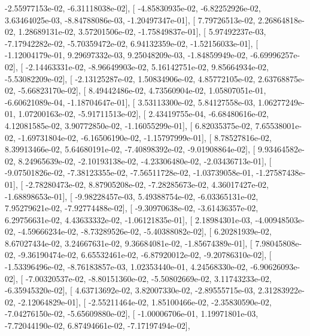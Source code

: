 \documentclass{article}
\begin{document}
         -2.55977153e-02,  -6.31118038e-02],
       [ -4.85830935e-02,  -6.82252926e-02,   3.63464025e-03,
         -8.84788086e-03,  -1.20497347e-01],
       [  7.79726513e-02,   2.26864818e-02,   1.28689131e-02,
          3.57201506e-02,  -1.75849837e-01],
       [  5.97492237e-03,  -7.17942282e-02,  -5.70359472e-02,
          6.94132359e-02,  -1.52156033e-01],
       [ -1.12004179e-01,   9.29697332e-03,   9.25048209e-03,
         -1.84859949e-02,  -6.69996257e-02],
       [ -2.14463331e-02,  -8.96649903e-02,   5.16142751e-02,
          9.85664934e-02,  -5.53082209e-02],
       [ -2.13125287e-02,   1.50834906e-02,   4.85772105e-02,
          2.63768875e-02,  -5.66823170e-02],
       [  8.49442486e-02,   4.73560904e-02,   1.05807051e-01,
         -6.60621089e-04,  -1.18704647e-01],
       [  3.53113300e-02,   5.84127558e-03,   1.06277249e-01,
          1.07200163e-02,  -5.91711513e-02],
       [  2.43419755e-04,  -6.68480616e-02,   4.12081585e-02,
          3.90772850e-02,  -1.16055299e-01],
       [  6.82035375e-02,   7.65538001e-02,  -1.69731804e-02,
         -6.16506190e-02,  -1.15797999e-01],
       [  8.78527816e-02,   8.39913466e-02,   5.64680191e-02,
         -7.40898392e-02,  -9.01908864e-02],
       [  9.93464582e-02,   8.24965639e-02,  -2.10193138e-02,
         -4.23306480e-02,  -2.03436713e-01],
       [ -9.07501826e-02,  -7.38123355e-02,  -7.56511728e-02,
         -1.03739058e-01,  -1.27587438e-01],
       [ -2.78280473e-02,   8.87905208e-02,  -7.28285673e-02,
          4.36017427e-02,  -1.68898653e-01],
       [ -9.98228457e-03,   5.49388754e-02,  -6.03365131e-02,
          7.95279621e-02,  -7.92774488e-02],
       [ -9.30970638e-02,  -3.61436357e-02,   6.29756631e-02,
          4.43633332e-02,  -1.06121835e-01],
       [  2.18984301e-03,  -4.00948503e-02,  -4.59666234e-02,
         -8.73289526e-02,  -5.40388082e-02],
       [  6.20281939e-02,   8.67027434e-02,   3.24667631e-02,
          9.36684081e-02,  -1.85674389e-01],
       [  7.98045808e-02,  -9.36190474e-02,   6.65532461e-02,
         -6.87920012e-02,  -9.20786310e-02],
       [ -1.53396496e-02,  -8.76183857e-03,   1.02353440e-01,
          4.24568330e-02,  -6.90626093e-02],
       [ -7.00320537e-02,  -8.80151360e-02,  -5.50802669e-02,
          3.11743233e-02,  -6.35945320e-02],
       [  4.63713692e-02,   3.82007330e-02,  -2.89555715e-03,
          2.31283922e-02,  -2.12064829e-01],
       [ -2.55211464e-02,   1.85100466e-02,  -2.35830590e-02,
         -7.04276150e-02,  -5.65609880e-02],
       [ -1.00006706e-01,   1.19971801e-03,  -7.72044190e-02,
          6.87494661e-02,  -7.17197494e-02],
\end{document}
